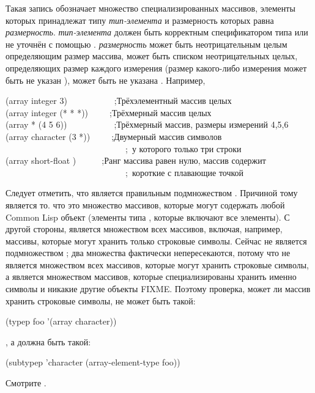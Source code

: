 \begin{flushdesc}
\item[\cd{(array \emph{тип-элемента} \emph{размерность})}]
  Такая запись обозначает множество специализированных массивов, элементы которых
  принадлежат типу \emph{тип-элемента} и размерность которых равна \emph{размерность}.
  \emph{тип-элемента} должен быть корректным спецификатором типа или не уточнён с
  помощью \cdf{*}.
  \emph{размерность} может быть неотрицательным целым определяющим размер массива,
  может быть списком неотрицательных целых, определяющих размер каждого измерения
  (размер какого-либо измерения может быть не указан \cdf{*}), может быть не
  указана \cdf{*}.
  Например,
  \begin{lisp}
    (array integer 3)~~~~~~~~~~~;\textrm{Трёхэлементный массив целых} \\
    (array integer (* * *))~~~~~;\textrm{Трёхмерный массив целых} \\
    (array * (4 5 6))~~~~~~~~~~~;\textrm{Трёхмерный массив, размеры измерений
      4,5,6} \\
    (array character (3 *))~~~~~;\textrm{Двумерный массив символов} \\
    ~~~~~~~~~~~~~~~~~~~~~~~~~~~~;~\textrm{у которого только три строки} \\
    (array short-float {\emptylist})~~~~~~;\textrm{Ранг массива равен нулю, массив содержит} \\
    ~~~~~~~~~~~~~~~~~~~~~~~~~~~~;~\textrm{короткие с плавающие точкой}
  \end{lisp}
  Следует отметить, что  является правильным подмножеством
  .
  Причиной тому является то. что  это множество массивов, которые
  могут содержать любой Common Lisp объект (элементы типа , которые включают
  все элементы). С другой стороны,  является множеством всех
  массивов, включая, например, массивы, которые могут хранить только строковые
  символы. Сейчас  не является подмножеством ;
  два множества фактически непересекаются, потому что  не
  является множеством всех массивов, которые могут хранить строковые символы, а
  является множеством массивов, которые специализированы хранить именно символы и
  никакие другие объекты FIXME. Поэтому проверка, может ли массив  хранить
  строковые символы, не может быть такой:
  \begin{lisp}
    (typep foo '(array character))
  \end{lisp}
  , а должна быть такой:
  \begin{lisp}
    (subtypep 'character (array-element-type foo))
  \end{lisp}
  Смотрите .


\end{flushdesc}
